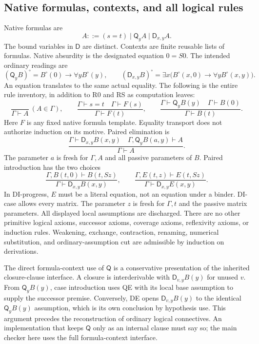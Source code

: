 \documentclass[11pt,letterpaper]{article}
\theoremstyle{definition}\newtheorem{definition}[theorem]{Definition}
\theoremstyle{remark}\newtheorem{remark}[theorem]{Remark}
\newcommand{\D}{\mathsf D}
\newcommand{\Q}{\mathsf Q}
\begin{document}
\subsection{Native formulas, contexts, and all logical rules}

Native formulas are
\[
            A::=(s=t)\mid\Q_y A\mid\D_{x,y}A.
\]
The bound variables in $\D$ are distinct. Contexts are finite reusable
lists of formulas. Native absurdity is the designated equation $0=S0$.
The intended ordinary readings are
\[
 (\Q_y B)^\circ=B^\circ(0)\to\forall yB^\circ(y),\qquad
 (\D_{x,y}B)^\circ=
 \exists x\bigl(B^\circ(x,0)\to\forall yB^\circ(x,y)\bigr).
\]
An equation translates to the same actual equality. The following is the
entire rule inventory, in addition to R0 and RS as computation leaves:
\[
 \frac{}{\Gamma\vdash A}\ (A\in\Gamma),\qquad
 \frac{\Gamma\vdash s=t\quad\Gamma\vdash F(s)}
      {\Gamma\vdash F(t)},\qquad
 \frac{\Gamma\vdash\Q_yB(y)\quad\Gamma\vdash B(0)}
      {\Gamma\vdash B(t)}.
 \tag{Hyp, Tr, QE}
\]
Here $F$ is any fixed native formula template. Equality transport does
not authorize induction on its motive. Paired elimination is
\[
 \frac{\Gamma\vdash\D_{x,y}B(x,y)\quad
       \Gamma,\Q_yB(a,y)\vdash A}{\Gamma\vdash A}.
 \tag{DE}
\]
The parameter $a$ is fresh for $\Gamma,A$ and all passive parameters of
$B$. Paired introduction has the two choices
\[
 \frac{\Gamma,B(t,0)\vdash B(t,Sz)}
      {\Gamma\vdash\D_{x,y}B(x,y)},\qquad
 \frac{\Gamma,E(t,z)\vdash E(t,Sz)}
      {\Gamma\vdash\D_{x,y}E(x,y)}.
 \tag{DI-case, DI-progress}
\]
In DI-progress, $E$ must be a literal equation, not an equation under a
binder. DI-case allows every matrix. The parameter $z$ is fresh for
$\Gamma,t$ and the passive matrix parameters. All displayed local
assumptions are discharged. There are no other primitive logical axioms,
successor axioms, coverage axioms, reflexivity axioms, or induction rules.
Weakening, exchange, contraction, renaming, numerical substitution, and
ordinary-assumption cut are admissible by induction on derivations.

The direct formula-context use of $\Q$ is a conservative presentation of
the inherited closure-clause interface. A closure is interderivable with
$\D_{v,y}B(y)$ for unused $v$. From $\Q_yB(y)$, case introduction
uses QE with its local base assumption to supply the successor premise.
Conversely, DE opens $\D_{v,y}B(y)$ to the identical $\Q_yB(y)$
assumption, which is its own conclusion by hypothesis use. This argument
precedes the reconstruction of ordinary logical connectives.
An implementation that keeps $\Q$ only as an internal clause
must say so; the main checker here uses the full formula-context interface.
\end{document}
